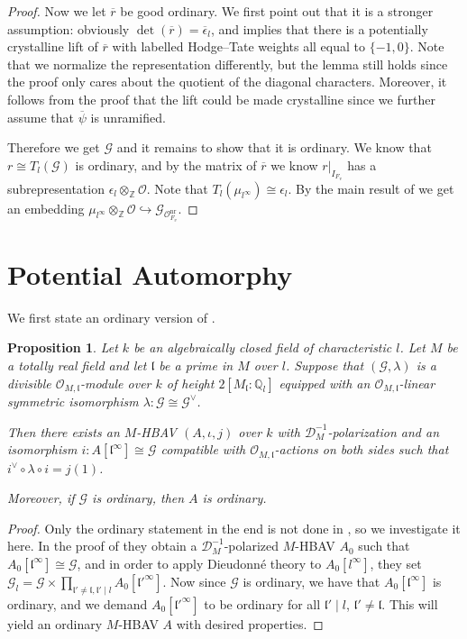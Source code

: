 \documentclass[10pt]{article}
\newtheorem{prop}[theorem]{Proposition}
\theoremstyle{definition}
\numberwithin{equation}{theorem}
\newcommand{\QQ}{\mathbb{Q}}
\newcommand{\ZZ}{\mathbb{Z}}
\newcommand{\calD}{\mathcal{D}}
\newcommand{\calG}{\mathcal{G}}
\newcommand{\calO}{\mathcal{O}}
\newcommand{\gothl}{\mathfrak{l}}
\begin{document}
\begin{proof}
Now we let $\overline{r}$ be good ordinary. We first point out that it is a stronger assumption: obviously $\det(\overline{r})=\overline{\epsilon}_l$, and \cite[Lemma~6.1.6]{BLGG12} implies that there is a potentially crystalline lift of $\overline{r}$ with labelled Hodge--Tate weights all equal to $\{-1,0\}$. Note that we normalize the representation differently, but the lemma still holds since the proof only cares about the quotient of the diagonal characters. Moreover, it follows from the proof that the lift could be made crystalline since we further assume that $\overline{\psi}$ is unramified. 

Therefore we get $\calG$ and it remains to show that it is ordinary. We know that $r\cong T_l(\calG)$ is ordinary, and by the matrix of $\overline{r}$ we know $r|_{I_{F_v}}$ has a subrepresentation $\epsilon_l\otimes_\ZZ\calO$. Note that $T_l(\mu_{l^\infty})\cong\epsilon_l$. By the main result of \cite{Tat67} we get an embedding $\mu_{l^\infty}\otimes_\ZZ\calO\hookrightarrow\calG_{\calO_{F_v}^\text{nr}}$.
\end{proof}

\section{Potential Automorphy}
We first state an ordinary version of \cite[Proposition~3.6]{AN19}. 

\begin{prop}\label{g3.6}
Let $k$ be an algebraically closed field of characteristic $l$. Let $M$ be a totally real field and let $\gothl$ be a prime in $M$ over $l$. Suppose that $(\calG,\lambda)$ is a divisible $\calO_{M,\gothl}$-module over $k$ of height $2[M_\gothl:\QQ_l]$ equipped with an $\calO_{M,\gothl}$-linear symmetric isomorphism $\lambda:\calG\cong\calG^\vee$.

Then there exists an $M$-HBAV $(A,\iota,j)$ over $k$ with $\calD_M^{-1}$-polarization and an isomorphism $i:A[\gothl^\infty]\cong\calG$ compatible with $\calO_{M,\gothl}$-actions on both sides such that $i^\vee\circ\lambda\circ i=j(1)$.

Moreover, if $\calG$ is ordinary, then $A$ is ordinary.
\end{prop}

\begin{proof}
Only the ordinary statement in the end is not done in \cite[Proposition~3.6]{AN19}, so we investigate it here. In the proof of \cite[Proposition~3.6]{AN19} they obtain a $\calD_M^{-1}$-polarized $M$-HBAV $A_0$ such that $A_0[\gothl^\infty]\cong\calG$, and in order to apply Dieudonn\'e theory to $A_0[l^\infty]$, they set $\calG_l=\calG\times\prod_{\gothl'\ne\gothl, \gothl'\mid l}A_0[\gothl'^\infty]$. Now since $\calG$ is ordinary, we have that $A_0[\gothl^\infty]$ is ordinary, and we demand $A_0[\gothl'^\infty]$ to be ordinary for all $\gothl'\mid l$, $\gothl'\ne\gothl$. This will yield an ordinary $M$-HBAV $A$ with desired properties.
\end{proof}
\end{document}
